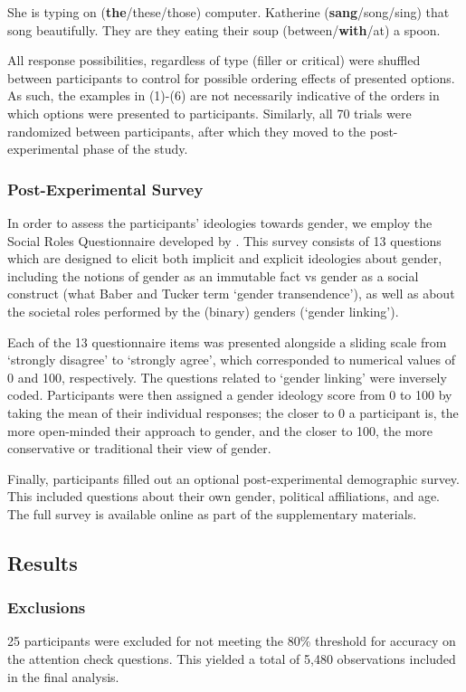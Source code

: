 \documentclass[10pt,letterpaper]{article}
\begin{document}
	\begin{exe}
		\ex She is typing on (\textbf{the}/these/those) computer.
		\ex Katherine (\textbf{sang}/song/sing) that song beautifully. 
		\ex They are they eating their soup (between/\textbf{with}/at) a spoon.
	\end{exe}

	All response possibilities, regardless of type (filler or critical) were shuffled between participants to control for possible ordering effects of presented options. As such, the examples in (1)-(6) are not necessarily indicative of the orders in which options were presented to participants. Similarly, all 70 trials were randomized between participants, after which they moved to the post-experimental phase of the study. 

	\subsubsection{Post-Experimental Survey} In order to assess the participants' ideologies towards gender, we employ the Social Roles Questionnaire developed by \textcite{baber2006social}. This survey consists of 13 questions which are designed to elicit both implicit and explicit ideologies about gender, including the notions of gender as an immutable fact vs gender as a social construct (what Baber and Tucker term `gender transendence'), as well as about the societal roles performed by the (binary) genders (`gender linking').\par 
	Each of the 13 questionnaire items was presented alongside a sliding scale from `strongly disagree' to `strongly agree', which corresponded to numerical values of 0 and 100, respectively. The questions related to `gender linking' were inversely coded. Participants were then assigned a gender ideology score from 0 to 100 by taking the mean of their individual responses; the closer to 0 a participant is, the more open-minded their approach to gender, and the closer to 100, the more conservative or traditional their view of gender.\par 
	Finally, participants filled out an optional post-experimental demographic survey. This included questions about their own gender, political affiliations, and age. The full survey is available online as part of the supplementary materials.
	
	\subsection{Results}
	\subsubsection{Exclusions} 25 participants were excluded for not meeting the 80\% threshold for accuracy on the attention check questions. This yielded a total of 5,480 observations included in the final analysis.
	
\end{document}
